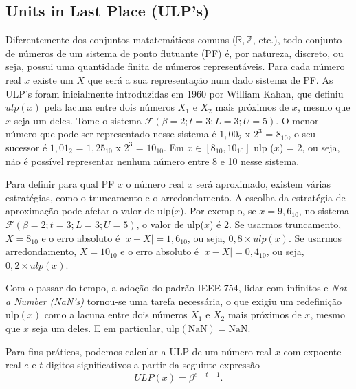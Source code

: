 \subsection{Units in Last Place (ULP's)}
Diferentemente dos conjuntos matatemáticos comuns ($\mathbb{R}, \mathbb{Z}$,
etc.), todo conjunto de números de um sistema de ponto flutuante (PF) é, por
natureza, discreto, ou seja, possui uma quantidade finita de números
representáveis. Para cada número real $x$ existe um $X$ que será a sua
representação num dado sistema de PF. As ULP's foram inicialmente introduzidas
em 1960 por William Kahan, que definiu $ulp(x)$ pela lacuna entre dois números
$X_{1}$ e $X_{2}$ mais próximos de $x$, mesmo que $x$ seja um deles. Tome o
sistema $\mathcal{F}(\beta = 2; t = 3; L = 3 ; U = 5)$. O menor número que pode
ser representado nesse sistema é $1{,}00_{2}$ x $2^{3}$ = $8_{10}$, o seu
sucessor é $1{,}01_{2}$ = $1{,}25_{10}$ x $2^{3}$ = $10_{10}$. Em $x \in
  [8_{10} , 10_{10}]$ ulp ($x$) = 2, ou seja, não é possível representar nenhum
número entre 8 e 10 nesse sistema.

Para definir para qual PF $x$ o número real $x$ será aproximado, existem várias
estratégias, como o truncamento e o arredondamento. A escolha da estratégia de
aproximação pode afetar o valor de ulp($x$). Por exemplo, se $x = 9{,}6_{10}$,
no sistema $\mathcal{F}(\beta = 2; t = 3; L = 3 ; U = 5)$, o valor de ulp($x$)
é 2. Se usarmos truncamento, $X = 8_{10}$ e o erro absoluto é $|x - X| =
  1{,}6_{10}$, ou seja, $0{,}8 \times ulp(x)$. Se usarmos arredondamento, $X =
  10_{10}$ e o erro absoluto é $|x - X| = 0{,}4_{10}$, ou seja, $0{,}2 \times
  ulp(x)$.

Com o passar do tempo, a adoção do padrão IEEE 754, lidar com infinitos e
\textit{Not a Number (NaN's)} tornou-se uma tarefa necessária, o que exigiu um
redefinição $\mathrm{ulp}(x)$ como a lacuna entre dois números $X_{1}$ e
$X_{2}$ mais próximos de $x$, mesmo que $x$ seja um deles. E em particular,
$\mathrm{ulp}(\mathrm{NaN}) = \mathrm{NaN}$.

Para fins práticos, podemos calcular a ULP de um número real $x$ com expoente
real $e$ e $t$ digitos significativos a partir da seguinte expressão
\begin{equation}
  ULP(x) = \beta^{e - t + 1}.
  \label{eq:ulp}
\end{equation}

